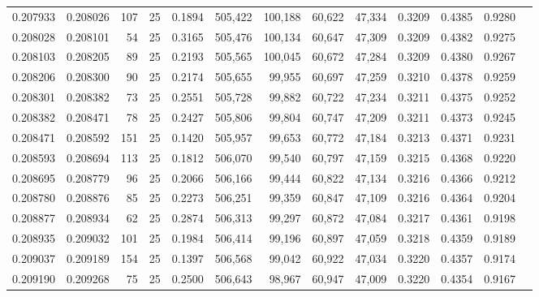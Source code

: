 \begin{tabular}{rrrrrrrrrrrrr}
0.207933 & 0.208026 &   107 &  25 &                                     0.1894 & 505,422 & 100,188 &  60,622 &  47,334 & 0.3209 & 0.4385 & 0.9280 \\
0.208028 & 0.208101 &    54 &  25 &                                     0.3165 & 505,476 & 100,134 &  60,647 &  47,309 & 0.3209 & 0.4382 & 0.9275 \\
0.208103 & 0.208205 &    89 &  25 &                                     0.2193 & 505,565 & 100,045 &  60,672 &  47,284 & 0.3209 & 0.4380 & 0.9267 \\
0.208206 & 0.208300 &    90 &  25 &                                     0.2174 & 505,655 &  99,955 &  60,697 &  47,259 & 0.3210 & 0.4378 & 0.9259 \\
0.208301 & 0.208382 &    73 &  25 &                                     0.2551 & 505,728 &  99,882 &  60,722 &  47,234 & 0.3211 & 0.4375 & 0.9252 \\
0.208382 & 0.208471 &    78 &  25 &                                     0.2427 & 505,806 &  99,804 &  60,747 &  47,209 & 0.3211 & 0.4373 & 0.9245 \\
0.208471 & 0.208592 &   151 &  25 &                                     0.1420 & 505,957 &  99,653 &  60,772 &  47,184 & 0.3213 & 0.4371 & 0.9231 \\
0.208593 & 0.208694 &   113 &  25 &                                     0.1812 & 506,070 &  99,540 &  60,797 &  47,159 & 0.3215 & 0.4368 & 0.9220 \\
0.208695 & 0.208779 &    96 &  25 &                                     0.2066 & 506,166 &  99,444 &  60,822 &  47,134 & 0.3216 & 0.4366 & 0.9212 \\
0.208780 & 0.208876 &    85 &  25 &                                     0.2273 & 506,251 &  99,359 &  60,847 &  47,109 & 0.3216 & 0.4364 & 0.9204 \\
0.208877 & 0.208934 &    62 &  25 &                                     0.2874 & 506,313 &  99,297 &  60,872 &  47,084 & 0.3217 & 0.4361 & 0.9198 \\
0.208935 & 0.209032 &   101 &  25 &                                     0.1984 & 506,414 &  99,196 &  60,897 &  47,059 & 0.3218 & 0.4359 & 0.9189 \\
0.209037 & 0.209189 &   154 &  25 &                                     0.1397 & 506,568 &  99,042 &  60,922 &  47,034 & 0.3220 & 0.4357 & 0.9174 \\
0.209190 & 0.209268 &    75 &  25 &                                     0.2500 & 506,643 &  98,967 &  60,947 &  47,009 & 0.3220 & 0.4354 & 0.9167 \\

\end{tabular}
